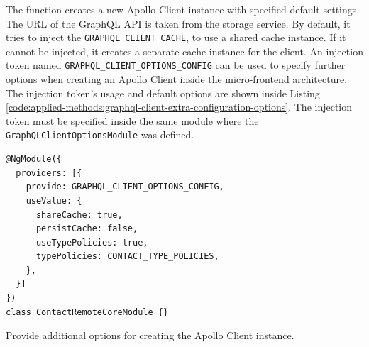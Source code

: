 \noindent The function creates a new Apollo Client instance with specified default settings. The \ac{URL} of the GraphQL \ac{API} is taken from the storage service. By default, it tries to inject the \texttt{GRAPHQL\_CLIENT\_CACHE}, to use a shared cache instance. If it cannot be injected, it creates a separate cache instance for the client. An injection token named \texttt{GRAPHQL\_CLIENT\_OPTIONS\_CONFIG} can be used to specify further options when creating an Apollo Client inside the micro-frontend architecture. The injection token's usage and default options are shown inside Listing \ref{code:applied-methods:graphql-client-extra-configuration-options}. The injection token must be specified inside the same module where the \texttt{GraphQLClientOptionsModule} was defined.

\ifshowListings
\begin{listing}[H]
\begin{verbatim}
@NgModule({
  providers: [{
    provide: GRAPHQL_CLIENT_OPTIONS_CONFIG,
    useValue: {
      shareCache: true,
      persistCache: false,
      useTypePolicies: true,
      typePolicies: CONTACT_TYPE_POLICIES,
    },
  }]
})
class ContactRemoteCoreModule {}
\end{verbatim}
\caption{Provide additional options for creating the Apollo Client instance.}\label{code:applied-methods:graphql-client-extra-configuration-options}
\end{listing}
\fi

